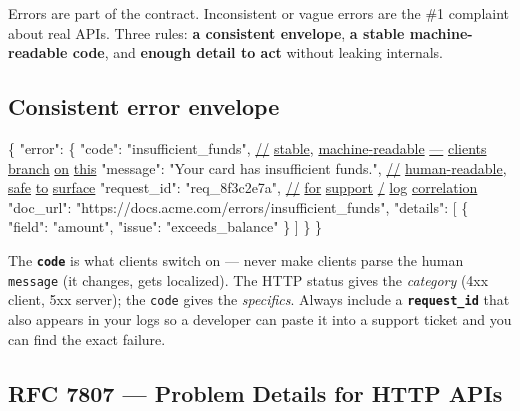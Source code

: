 \documentclass[11pt]{article}
\newenvironment{Shaded}{\begin{snugshade}}{\end{snugshade}}
\newcommand{\DataTypeTok}[1]{\textcolor[rgb]{0.16,0.50,0.73}{#1}}
\newcommand{\ErrorTok}[1]{\textcolor[rgb]{0.85,0.27,0.33}{\underline{#1}}}
\newcommand{\FunctionTok}[1]{\textcolor[rgb]{0.56,0.27,0.68}{#1}}
\newcommand{\OtherTok}[1]{\textcolor[rgb]{0.15,0.68,0.38}{#1}}
\newcommand{\StringTok}[1]{\textcolor[rgb]{0.96,0.31,0.31}{#1}}
\begin{document}
Errors are part of the contract. Inconsistent or vague errors are the \#1 complaint about real APIs. Three rules: \textbf{a consistent envelope}, \textbf{a stable machine-readable code}, and \textbf{enough detail to act} without leaking internals.

\subsection{Consistent error envelope}\label{consistent-error-envelope}


\begin{Shaded}
\begin{Highlighting}[]
\FunctionTok{\{}
  \DataTypeTok{"error"}\FunctionTok{:} \FunctionTok{\{}
    \DataTypeTok{"code"}\FunctionTok{:} \StringTok{"insufficient\_funds"}\FunctionTok{,}          \ErrorTok{//} \ErrorTok{stable}\FunctionTok{,} \ErrorTok{machine{-}readable} \ErrorTok{—} \ErrorTok{clients} \ErrorTok{branch} \ErrorTok{on} \ErrorTok{this}
    \DataTypeTok{"message"}\FunctionTok{:} \StringTok{"Your card has insufficient funds."}\FunctionTok{,}   \ErrorTok{//} \ErrorTok{human{-}readable}\FunctionTok{,} \ErrorTok{safe} \ErrorTok{to} \ErrorTok{surface}
    \DataTypeTok{"request\_id"}\FunctionTok{:} \StringTok{"req\_8f3c2e7a"}\FunctionTok{,}           \ErrorTok{//} \ErrorTok{for} \ErrorTok{support} \ErrorTok{/} \ErrorTok{log} \ErrorTok{correlation}
    \DataTypeTok{"doc\_url"}\FunctionTok{:} \StringTok{"https://docs.acme.com/errors/insufficient\_funds"}\FunctionTok{,}
    \DataTypeTok{"details"}\FunctionTok{:} \OtherTok{[}
      \FunctionTok{\{} \DataTypeTok{"field"}\FunctionTok{:} \StringTok{"amount"}\FunctionTok{,} \DataTypeTok{"issue"}\FunctionTok{:} \StringTok{"exceeds\_balance"} \FunctionTok{\}}
    \OtherTok{]}
  \FunctionTok{\}}
\FunctionTok{\}}
\end{Highlighting}
\end{Shaded}

The \textbf{\texttt{code}} is what clients switch on --- never make clients parse the human \texttt{message} (it changes, gets localized). The HTTP status gives the \emph{category} (4xx client, 5xx server); the \texttt{code} gives the \emph{specifics}. Always include a \textbf{\texttt{request\_id}} that also appears in your logs so a developer can paste it into a support ticket and you can find the exact failure.

\subsection{RFC 7807 --- Problem Details for HTTP APIs}\label{rfc-7807--problem-details-for-http-apis}
\end{document}
